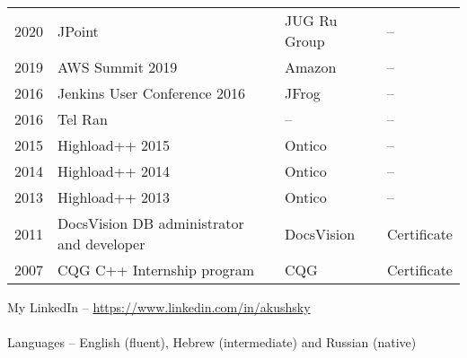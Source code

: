\documentclass[11pt]{article}
\begin{document}
\begin{longtable} {l|p{}|p{}|l}
2020    & JPoint     & JUG Ru Group   & --\\
2019    & AWS Summit 2019     & Amazon  & --\\
2016    & Jenkins User Conference 2016     & JFrog  & --\\
2016    & Tel Ran                & --      & --\\
2015    & Highload++ 2015        & Ontico  & --\\
2014    & Highload++ 2014        & Ontico  & --\\
2013    & Highload++ 2013        & Ontico  & --\\
2011    & DocsVision DB administrator and developer       & DocsVision        & Certificate\\
2007    & CQG C++ Internship program     & CQG     & Certificate\\
\end{longtable}
\fi

\noindent My LinkedIn -- \href{https://www.linkedin.com/in/akushsky}{https://www.linkedin.com/in/akushsky} \\ \\
\noindent Languages -- English (fluent), Hebrew (intermediate) and Russian (native)
\end{document}
